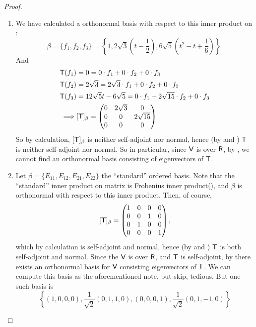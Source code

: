 \begin{proof}
\begin{enumerate}
\item We have calculated a orthonormal basis with respect to this inner product on :
\[
    \beta = \{ f_1, f_2, f_3 \} = \left\{ 1, 2\sqrt{3} \left( t - \frac{1}{2} \right), 6\sqrt{5} \left( t^2 - t + \frac{1}{6} \right) \right\}.
\]
And
\begin{align*}
    \textsf{T}(f_1) & = 0 = 0 \cdot f_1 + 0 \cdot f_2 + 0 \cdot f_3 \\
    \textsf{T}(f_2) & = 2\sqrt{3} = 2\sqrt{3} \cdot f_1 + 0 \cdot f_2 + 0 \cdot f_3 \\
    \textsf{T}(f_3) & = 12\sqrt{5}t - 6\sqrt{5} = 0 \cdot f_1 + 2\sqrt{15} \cdot f_2 + 0 \cdot f_3 \\
    \implies &
    [\textsf{T}]_{\beta} = \begin{pmatrix}
        0 & 2\sqrt{3} & 0 \\
        0 & 0 & 2\sqrt{15} \\
        0 & 0 & 0
    \end{pmatrix}
\end{align*}
So by calculation, \([\textsf{T}]_{\beta}\) is neither self-adjoint nor normal, hence (by  and ) \(\textsf{T}\) is neither self-adjoint nor normal.
So in particular, since \(\textsf{V}\) is over \(\textsf{R}\), by , we cannot find an orthonormal basis consisting of eigenvectors of \(\textsf{T}\).

\item Let \(\beta = \{ E_{11}, E_{12}, E_{21}, E_{22} \}\) the ``standard'' ordered basis.
Note that the ``standard'' inner product on matrix is Frobenius inner product(), and \(\beta\) is orthonormal with respect to this inner product.
Then, of course,
\[
    [\textsf{T}]_{\beta} = \begin{pmatrix}
        1 & 0 & 0 & 0 \\
        0 & 0 & 1 & 0 \\
        0 & 1 & 0 & 0 \\
        0 & 0 & 0 & 1
    \end{pmatrix},
\]
which by calculation is self-adjoint and normal, hence (by  and ) \(\textsf{T}\) is both self-adjoint and normal.
Since the \(\textsf{V}\) is over \(\textsf{R}\), and \(\textsf{T}\) is self-adjoint, by  there exists an orthonormal basis for \(\textsf{V}\) consisting eigenvectors of \(\textsf{T}\).
We can compute this basis as the aforementioned note, but skip, tedious.
But one such basis is
\[
    \left\{ (1,0,0,0), \frac{1}{\sqrt{2}}(0,1,1,0),(0,0,0,1), \frac{1}{\sqrt{2}}(0,1,-1,0)\right \}
\]


\end{enumerate}
\end{proof}
